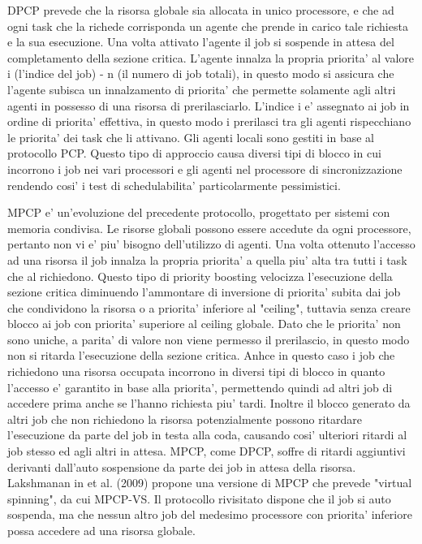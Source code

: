 DPCP prevede che la risorsa globale sia allocata in unico processore, e che ad ogni task che la richede corrisponda un agente che prende in carico tale richiesta e la sua esecuzione. Una volta attivato l'agente il job si sospende in attesa del completamento della sezione critica. L'agente innalza la propria priorita' al valore i (l'indice del job) - n (il numero di job totali), in questo modo si assicura che l'agente subisca un innalzamento di priorita' che permette solamente agli altri agenti in possesso di una risorsa di prerilasciarlo. L'indice i e' assegnato ai job in ordine di priorita' effettiva, in questo modo i prerilasci tra gli agenti rispecchiano le priorita' dei task che li attivano. Gli agenti locali sono gestiti in base al protocollo PCP.
Questo tipo di approccio causa diversi tipi di blocco in cui incorrono i job nei vari processori e gli agenti nel processore di sincronizzazione rendendo cosi' i test di schedulabilita' particolarmente pessimistici.

MPCP e' un'evoluzione del precedente protocollo, progettato per sistemi con memoria condivisa. Le risorse globali possono essere accedute da ogni processore, pertanto non vi e' piu' bisogno dell'utilizzo di agenti. Una volta ottenuto l'accesso ad una risorsa il job innalza la propria priorita' a quella piu' alta tra tutti i task che al richiedono. Questo tipo di priority boosting velocizza l'esecuzione della sezione critica diminuendo l'ammontare di inversione di priorita' subita dai job che condividono la risorsa o a priorita' inferiore al "ceiling", tuttavia senza creare blocco ai job con priorita' superiore al ceiling globale. Dato che le priorita' non sono uniche, a parita' di valore non viene permesso il prerilascio, in questo modo non si ritarda l'esecuzione della sezione critica.
Anhce in questo caso i job che richiedono una risorsa occupata incorrono in diversi tipi di blocco in quanto l'accesso e' garantito in base alla priorita', permettendo quindi ad altri job di accedere prima anche se l'hanno richiesta piu' tardi. Inoltre il blocco generato da altri job che non richiedono la risorsa potenzialmente possono ritardare l'esecuzione da parte del job in testa alla coda, causando cosi' ulteriori ritardi al job stesso ed agli altri in attesa.
MPCP, come DPCP, soffre di ritardi aggiuntivi derivanti dall'auto sospensione da parte dei job in attesa della risorsa. Lakshmanan  in et al. (2009) propone una versione di MPCP che prevede "virtual spinning", da cui MPCP-VS. Il protocollo rivisitato dispone che il job si auto sospenda, ma che nessun altro job del medesimo processore con priorita' inferiore possa accedere ad una risorsa globale.

